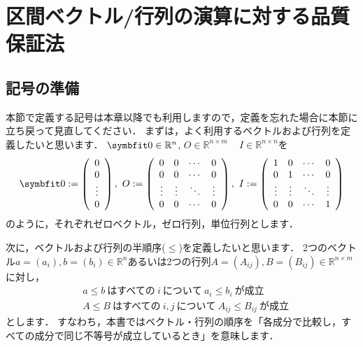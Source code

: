 \chapter{区間ベクトル/行列の演算に対する品質保証法} \label{chap:basic_matrix}


\section{記号の準備}\label{sec:linear_notation}
本節で定義する記号は本章以降でも利用しますので，定義を忘れた場合に本節に立ち戻って見直してください．
まずは，よく利用するベクトルおよび行列を定義したいと思います．
$\vector{0} \in {\mathbb R}^n$, $O \in {\mathbb R}^{n \times m}$ ~ $I \in {\mathbb R}^{n \times n}$を
\begin{align*}
	\vector{0} := \left( \begin{array}{c}
		0 \\
		0 \\
		\vdots \\
		0
	\end{array}\right), ~ O := \left( \begin{array}{c c c c}
		0 & 0 & \cdots & 0 \\
		0 & 0 & \cdots & 0 \\
		\vdots & \vdots & \ddots & \vdots  \\
		0 & 0 & \cdots & 0
	\end{array}\right), ~ I := \left( \begin{array}{c c c c}
		1 & 0 & \cdots & 0 \\
		0 & 1 & \cdots & 0 \\
		\vdots & \vdots & \ddots & \vdots  \\
		0 & 0 & \cdots & 1
	\end{array}\right)
\end{align*}
のように，それぞれゼロベクトル，ゼロ行列，単位行列とします．


次に，ベクトルおよび行列の半順序($\le$)を定義したいと思います．
2つのベクトル$a = (a_i),  b = (b_i) \in {\mathbb R}^n$あるいは2つの行列$A = (A_{ij}), B = (B_{ij}) \in {\mathbb R}^{n \times m}$に対し，
\begin{align*}
	& a \le b ~ \mbox{はすべての} ~ i ~{について} ~ a_i \le b_i ~ \mbox{が成立} \\
	& A \le B ~ \mbox{はすべての} ~ i, j ~{について} ~ A_{ij} \le B_{ij} ~ \mbox{が成立}
\end{align*}
とします．
すなわち，本書ではベクトル・行列の順序を「各成分で比較し，すべての成分で同じ不等号が成立しているとき」を意味します．

